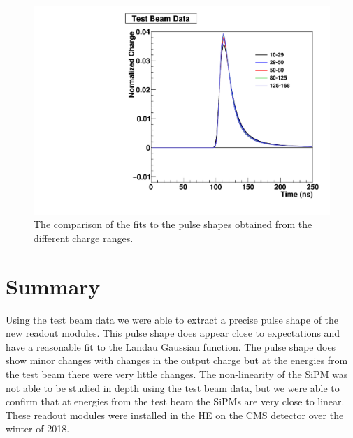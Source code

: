 \begin{figure}
\centering
\includegraphics[width=0.8\linewidth]{Figures/Overlap.pdf}
\caption{The comparison of the fits to the pulse shapes obtained from the different charge ranges.}
\label{fig:Overlap}
\end{figure}


\section{Summary}

Using the test beam data we were able to extract a precise pulse shape of the new readout modules. This pulse shape does appear close to expectations and have a reasonable fit to the Landau Gaussian function. The pulse shape does show minor changes with changes in the output charge but at the energies from the test beam there were very little changes. The non-linearity of the SiPM was not able to be studied in depth using the test beam data, but we were able to confirm that at energies from the test beam the SiPMs are very close to linear. These readout modules were installed in the HE on the CMS detector over the winter of 2018. 

